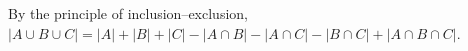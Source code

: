 By the principle of inclusion–exclusion, $\lvert A \cup B \cup C \rvert = \lvert A \rvert + \lvert B \rvert + \lvert C \rvert - \lvert A \cap B \rvert - \lvert A \cap C \rvert - \lvert B \cap C \rvert + \lvert A \cap B \cap C \rvert$.